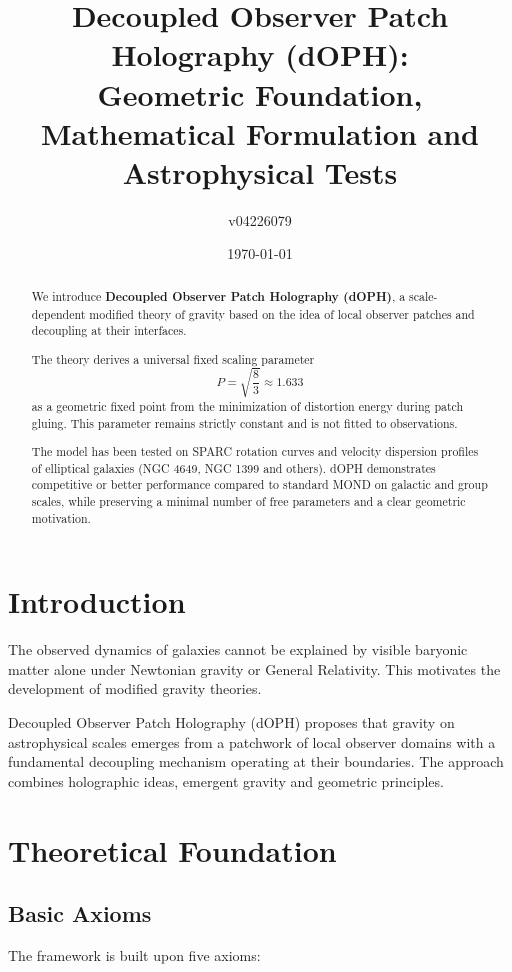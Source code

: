 \documentclass[12pt,a4paper]{article}
\title{Decoupled Observer Patch Holography (dOPH): \\
Geometric Foundation, Mathematical Formulation and Astrophysical Tests}
\author{v04226079}
\date{\today}
\begin{document}
\maketitle

\begin{abstract}
We introduce \textbf{Decoupled Observer Patch Holography (dOPH)}, a scale-dependent modified theory of gravity based on the idea of local observer patches and decoupling at their interfaces. 

The theory derives a universal fixed scaling parameter 
\[
P = \sqrt{\frac{8}{3}} \approx 1.633
\]
as a geometric fixed point from the minimization of distortion energy during patch gluing. This parameter remains strictly constant and is not fitted to observations.

The model has been tested on SPARC rotation curves and velocity dispersion profiles of elliptical galaxies (NGC 4649, NGC 1399 and others). dOPH demonstrates competitive or better performance compared to standard MOND on galactic and group scales, while preserving a minimal number of free parameters and a clear geometric motivation.
\end{abstract}

\section{Introduction}

The observed dynamics of galaxies cannot be explained by visible baryonic matter alone under Newtonian gravity or General Relativity. This motivates the development of modified gravity theories. 

Decoupled Observer Patch Holography (dOPH) proposes that gravity on astrophysical scales emerges from a patchwork of local observer domains with a fundamental decoupling mechanism operating at their boundaries. The approach combines holographic ideas, emergent gravity and geometric principles.

\section{Theoretical Foundation}

\subsection{Basic Axioms}

The framework is built upon five axioms:
\end{document}
